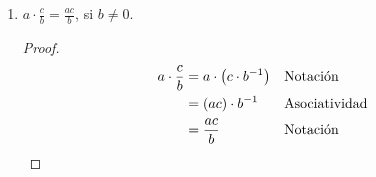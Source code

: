 \documentclass[11pt]{article}
\begin{document}
\begin{enumerate}[label=\alph*)]
    \item $a \cdot \frac{c}{b} = \frac{ac}{b}$, si $b \neq 0$.
    \vspace{-1em}
    \begin{proof} 
    \begin{align*}
        a\cdot \frac{c}{b} &= a\cdot \bigl(c\cdot b^{-1}\bigr) && \text{Notación}\\
        &= (ac) \cdot b^{-1} && \text{Asociatividad}\\
        &= \frac{ac}{b} && \text{Notación} \qedhere
    \end{align*}
    \end{proof} \vspace{-1em}


\end{enumerate}
\end{document}
